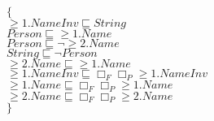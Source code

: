 \documentclass[a4paper,10pt]{article}
\begin{document}
 \newcommand{\nxt}{{\ensuremath\raisebox{0.25ex}{\text{\scriptsize$\bigcirc$}}}}
\newcommand{\Rdiamond}{\Diamond_{\!F}}
\newcommand{\Rbox}{\Box_{\!F}}
\newcommand{\Rnext}{\nxt_{\!F}}
\newcommand{\Ldiamond}{\Diamond_{\!P}}
\newcommand{\Lbox}{\Box_{\!P}}
\newcommand{\Lnext}{\nxt_{\!P}}
\newcommand{\SVdiamond}{\mathop{\ooalign{$\Diamond$ \cr \kern0.5ex
    \raisebox{0.35ex}{\scalebox{0.7}{$*$}}} \kern-0.9ex}}
\newcommand{\SVbox}{\mathop{\ooalign{$\Box$ \cr \kern0.42ex
    \raisebox{0.3ex}{\scalebox{0.7}{$*$}}} \kern-0.9ex}}


 $\{$\\ 
$ \ge 1.NameInv \sqsubseteq String$\\ 
 $Person \sqsubseteq  \ge 1.Name$\\ 
 $Person \sqsubseteq  \lnot  \ge 2.Name$\\ 
 $String \sqsubseteq  \lnot Person$\\ 
 $ \ge 2.Name \sqsubseteq  \ge 1.Name$\\ 
 $ \ge 1.NameInv \sqsubseteq  \Rbox  \Lbox  \ge 1.NameInv$\\ 
 $ \ge 1.Name \sqsubseteq  \Rbox  \Lbox  \ge 1.Name$\\ 
 $ \ge 2.Name \sqsubseteq  \Rbox  \Lbox  \ge 2.Name$\\ 
 $\}$ 
\end{document}
